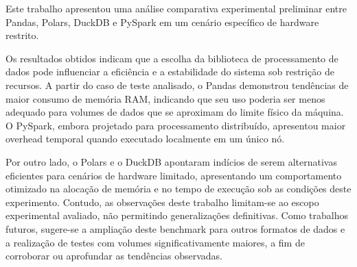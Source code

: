 \documentclass[12pt]{article}
\begin{document}
Este trabalho apresentou uma análise comparativa experimental preliminar entre Pandas, Polars, DuckDB e PySpark em um cenário específico de hardware restrito.

Os resultados obtidos indicam que a escolha da biblioteca de processamento de dados pode influenciar a eficiência e a estabilidade do sistema sob restrição de recursos. A partir do caso de teste analisado, o Pandas demonstrou tendências de maior consumo de memória RAM, indicando que seu uso poderia ser menos adequado para volumes de dados que se aproximam do limite físico da máquina. O PySpark, embora projetado para processamento distribuído, apresentou maior overhead temporal quando executado localmente em um único nó.

Por outro lado, o Polars e o DuckDB apontaram indícios de serem alternativas eficientes para cenários de hardware limitado, apresentando um comportamento otimizado na alocação de memória e no tempo de execução sob as condições deste experimento. Contudo, as observações deste trabalho limitam-se ao escopo experimental avaliado, não permitindo generalizações definitivas. Como trabalhos futuros, sugere-se a ampliação deste benchmark para outros formatos de dados e a realização de testes com volumes significativamente maiores, a fim de corroborar ou aprofundar as tendências observadas.

 
\end{document}
